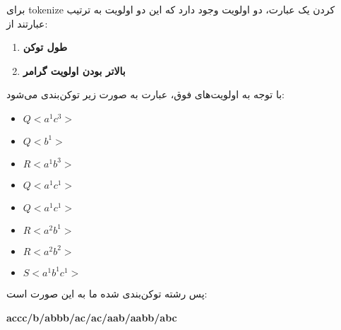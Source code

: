 برای tokenize کردن یک عبارت، دو اولویت وجود دارد که این دو اولویت به ترتیب عبارتند از:
\begin{enumerate}
	\item \textbf{طول توکن}
	\item \textbf{بالاتر بودن اولویت گرامر}
\end{enumerate}
با توجه به اولویت‌های فوق، عبارت به صورت زیر توکن‌بندی می‌شود:

\setLTR
\begin{itemize}

	\item $Q<a^1c^3>$ 

\item $Q<b^1>$ 

\item  $R<a^1b^3>$ 

 \item  $Q<a^1c^1>$ 

  \item  $Q<a^1c^1>$ 

  \item   $R<a^2b^1>$ 

   \item  $R<a^2b^2>$ 

   \item  $S<a^1b^1c^1>$
     
   \end{itemize} 
\setRTL
پس رشته توکن‌بندی شده ما به این صورت است:
\begin{center}
	\textbf{accc/b/abbb/ac/ac/aab/aabb/abc}
\end{center}

    \setRTL 
     